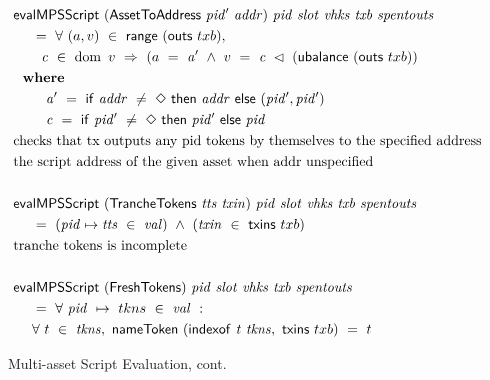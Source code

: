 \begin{figure*}[htb]
  \begin{align*}
    & \mathsf{evalMPSScript}
     ~(\mathsf{AssetToAddress}~\mathit{pid'}~\mathit{addr})~\mathit{pid}~ \mathit{slot}~\mathit{vhks} ~\mathit{txb}~\mathit{spentouts} \\
    &~~~~ =~ \forall~(a, v)~\in~\mathsf{range}~(\mathsf{outs}~txb),~\\
    &~~~~~~ \mathit{c}~\in~\operatorname{dom}~v~\Rightarrow~(a~=~ \mathit{a'} ~\wedge~
                       v~=~\mathit{c}~ \lhd~(\mathsf{ubalance}~(\mathsf{outs}~txb)) \\
    & ~ ~ \mathbf{where}~ ~  \\
    & ~~~~~~~ \mathit{a'}~=~\mathsf{if}~ \mathit{addr}~\neq~\Diamond~\mathsf{then}~\mathit{addr}~\mathsf{else}~\mathit{(pid',pid')} \\
    & ~~~~~~~ \mathit{c}~=~\mathsf{if}~ \mathit{pid'}~\neq~\Diamond~\mathsf{then}~\mathit{pid'}~\mathsf{else}~\mathit{pid} \\
    & \text{checks that tx outputs any pid tokens by themselves to the specified address} \\
    & \text {the script address of the given asset when addr unspecified} \\~\\
    & \mathsf{evalMPSScript}
     ~(\mathsf{TrancheTokens}~\mathit{tts}~\mathit{txin})~\mathit{pid}~\mathit{slot}~\mathit{vhks}
     ~\mathit{txb}~\mathit{spentouts}  \\
    &~~~~ =~(\mathit{pid}\mapsto\mathit{tts}~\in~\mathit{val})~ \wedge~(\mathit{txin}~\in~\mathsf{txins}~{txb}) \\
    & \text{tranche tokens is incomplete} \\~\\
    & \mathsf{evalMPSScript}
     ~(\mathsf{FreshTokens})~\mathit{pid}~\mathit{slot}~\mathit{vhks}
     ~\mathit{txb}~\mathit{spentouts}
      \\
    &~~~~ =~\forall~\mathit{pid}~ \mapsto ~tkns ~\in~ \mathit{val}~:~ \\
    &~~~~ \forall~t~\in~\mathit{tkns},~
        \mathsf{nameToken}~(\mathsf{indexof}~\mathit{t}~\mathit{tkns},~\mathsf{txins}~{txb})~=~t
    \end{align*}
    \caption{Multi-asset Script Evaluation, cont.}
    \label{fig:defs:tx-mc-eval-3}
\end{figure*}

